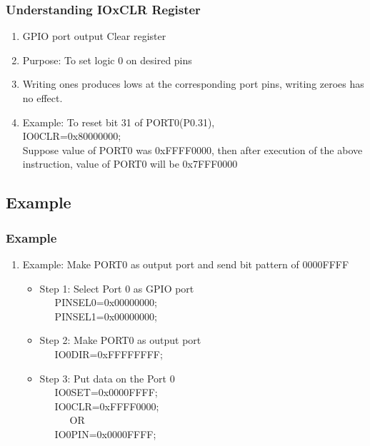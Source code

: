 \documentclass[10pt,red]{beamer}
\begin{document}
\begin{frame}
	\frametitle{Understanding IOxCLR Register} \pause
	\begin{enumerate}
		\item<+-|alert@+> GPIO port output Clear register\\[10pt]
		\item<+-|alert@+> Purpose: To set logic 0 on desired pins   \\[10pt]
		\item<+-|alert@+> Writing ones produces lows at the corresponding port pins, writing zeroes has no effect.\\[10pt]
		\item<+-|alert@+> \color{red}Example: To reset bit 31 of PORT0(P0.31),  \\[10pt] \pause
		\color{black} 
		IO0CLR=0x80000000; \\[10pt] \pause
		Suppose value of PORT0 was 0xFFFF0000, then after execution of the above instruction, value of PORT0 will be 0x7FFF0000 \pause
	\end{enumerate}
\end{frame}

\subsection{Example}
\begin{frame}
	\frametitle{Example}
	\begin{enumerate}
		\item<+-|alert@+> Example: Make PORT0 as output port and send bit pattern of 0000FFFF	\\[5pt]	\pause
		\begin{itemize}
			\item<+-|alert@+> Step 1: Select Port 0 as GPIO port \\[5pt]
			\ \ \	PINSEL0=0x00000000; \\
			\ \ \	PINSEL1=0x00000000; \\[5pt] \pause
			\item<+-|alert@+> Step 2: Make PORT0 as output port	\\[5pt]
			\ \ \ IO0DIR=0xFFFFFFFF; \\[5pt] \pause
			\item<+-|alert@+> Step 3: Put data on the Port 0 \\[5pt]
			\ \ \ IO0SET=0x0000FFFF; \\ 
			\ \ \ IO0CLR=0xFFFF0000; \\[5pt] \pause
			\ \ \ \ \ \ OR \\[5pt]
			\ \ \ IO0PIN=0x0000FFFF; \pause
		\end{itemize} 	
	\end{enumerate}
\end{frame}
\end{document}
